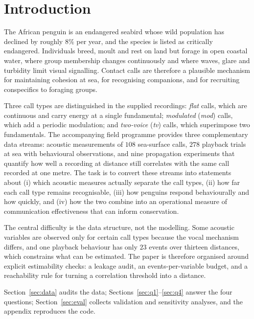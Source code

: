 \documentclass{apmcmthesis}
\begin{document}
\newpage
\tableofcontents

\newpage
\pagestyle{mainmatterstyle}
\setcounter{page}{1}

\section{Introduction}

The African penguin is an endangered seabird whose wild population has declined by
roughly $8\%$ per year, and the species is listed as critically endangered. Individuals
breed, moult and rest on land but forage in open coastal water, where group membership
changes continuously and where waves, glare and turbidity limit visual signalling.
Contact calls are therefore a plausible mechanism for maintaining cohesion at sea, for
recognising companions, and for recruiting conspecifics to foraging groups.

Three call types are distinguished in the supplied recordings: \emph{flat} calls, which
are continuous and carry energy at a single fundamental; \emph{modulated} (\emph{mod})
calls, which add a periodic modulation; and \emph{two-voice} (\emph{tv}) calls, which
superimpose two fundamentals. The accompanying field programme provides three
complementary data streams: acoustic measurements of $108$ sea-surface calls, $278$
playback trials at sea with behavioural observations, and nine propagation experiments
that quantify how well a recording at distance still correlates with the same call
recorded at one metre. The task is to convert these streams into statements about (i)
which acoustic measures actually separate the call types, (ii) how far each call type
remains recognisable, (iii) how penguins respond behaviourally and how quickly, and (iv)
how the two combine into an operational measure of communication effectiveness that can
inform conservation.

The central difficulty is the data structure, not the modelling. Some acoustic variables
are observed only for certain call types because the vocal mechanism differs, and one
playback behaviour has only $23$ events over thirteen distances, which constrains what can
be estimated. The paper is therefore organised around explicit estimability checks: a
leakage audit, an events-per-variable budget, and a reachability rule for turning a
correlation threshold into a distance.

Section~\ref{sec:data} audits the data; Sections~\ref{sec:q1}--\ref{sec:q4} answer the
four questions; Section~\ref{sec:eval} collects validation and sensitivity analyses, and
the appendix reproduces the code.
\end{document}
